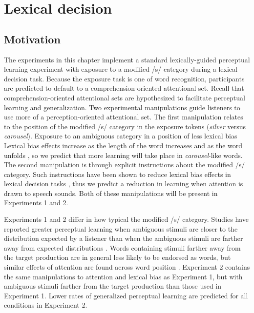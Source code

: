 
\chapter{Lexical decision}
\label{chap:lexdec}

\section{Motivation}

The experiments in this chapter implement a standard lexically-guided perceptual learning experiment with exposure to a modified /s/ category during a lexical decision task.
Because the exposure task is one of word recognition, participants are predicted to default to a comprehension-oriented attentional set.  
Recall that comprehension-oriented attentional sets are hypothesized to facilitate perceptual learning and generalization.
Two experimental manipulations guide listeners to use more of  a perception-oriented attentional set.
The first manipulation relates to the position of the modified /s/ category in the exposure tokens (\emph{silver} versus \emph{carousel}).
Exposure to an ambiguous category in a position of less lexical bias 
Lexical bias effects increase as the length of the word increases and as the word unfolds \citep{Pitt2006, Pitt2012}, so we predict that more learning will take place in \emph{carousel}-like words.
The second manipulation is through explicit instructions about the modified /s/ category.
Such instructions have been shown to reduce lexical bias effects in lexical decision tasks \citep{Pitt2012}, thus we predict a reduction in learning when attention is drawn to speech sounds.
Both of these manipulations will be present in Experiments 1 and 2.

Experiments 1 and 2 differ in how typical the modified /s/ category.
Studies have reported greater perceptual learning when ambiguous stimuli are closer to the distribution expected by a listener than when the ambiguous stimuli are farther away from expected distributions \citep{Sumner2011}.  
Words containing stimuli farther away from the target production are in general less likely to be endorsed as words, but similar effects of attention are found across word position \citep{Pitt2012}.  
Experiment 2 contains the same manipulations to attention and lexical bias as Experiment 1, but with ambiguous stimuli farther from the target production than those used in Experiment 1.
Lower rates of generalized perceptual learning are predicted for all conditions in Experiment 2.

